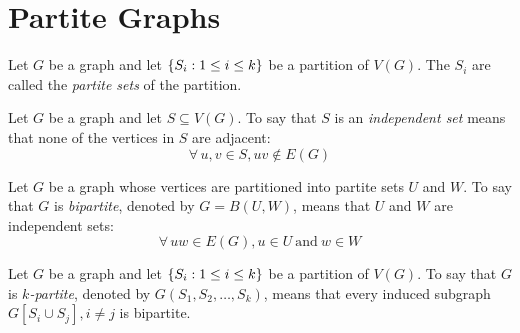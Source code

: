 \documentclass[letterpaper,12pt,fleqn]{article}
\begin{document}
\section*{Partite Graphs}

\begin{definition}
  Let \(G\) be a graph and let \(\{S_i:1\le i\le k\}\) be a partition of \(V(G)\).  The \(S_i\) are called the
  \emph{partite sets} of the partition.
\end{definition}

\begin{definition}
  Let \(G\) be a graph and let \(S\subseteq V(G)\).  To say that \(S\) is an \emph{independent set} means that none
  of the vertices in \(S\) are adjacent:
  \[\forall\,u,v\in S,uv\notin E(G)\]
\end{definition}

\begin{definition}[Bipartite]
  Let \(G\) be a graph whose vertices are partitioned into partite sets \(U\) and \(W\).  To say that \(G\) is
  \emph{bipartite}, denoted by \(G=B(U,W)\), means that \(U\) and \(W\) are independent sets:
  \[\forall\,uw\in E(G),u\in U\ \text{and}\ w\in W\]
\end{definition}

\begin{definition}[\(k\)-Partite]
  Let \(G\) be a graph and let \(\{S_i:1\le i\le k\}\) be a partition of \(V(G)\).  To say that \(G\) is
  \emph{\(k\)-partite}, denoted by \(G(S_1,S_2,\ldots,S_k)\), means that every induced subgraph
  \(G[S_i\cup S_j],i\ne j\) is bipartite.
\end{definition}
\end{document}
